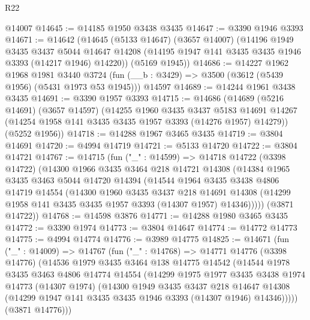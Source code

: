 \begin{lexlean}{R22}
\begin{coremodule}
    @14007
@14645 := @14185 @1950 @3438 @3435
@14647 := @3390 @1946 @3393
@14671 := @14642
    (@14645
      (@5133 @14647)
      (@3657 @14007)
      (@14196
        @1949
        @3435
        @3437
        @5044
        @14647
        @14208
        (@14195 @1947 @141 @3435 @3435 @1946 @3393 (@14217 @1946) @14220))
      (@5169 @1945))
@14686 := @14227
    @1962
    @1968
    @1981
    @3440
    @3724
    (fun (__b : @3429) => @3500 (@3612 (@5439 @1956) (@5431 @1973 @53 @1945)))
    @14597
@14689 := @14244 @1961 @3438 @3435
@14691 := @3390 @1957 @3393
@14715 := @14686
    (@14689
      (@5216 @14691)
      (@3657 @14597)
      (@14255
        @1960
        @3435
        @3437
        @5183
        @14691
        @14267
        (@14254 @1958 @141 @3435 @3435 @1957 @3393 (@14276 @1957) @14279))
      (@5252 @1956))
@14718 := @14288 @1967 @3465 @3435
@14719 := @3804 @14691
@14720 := @4994 @14719
@14721 := @5133 @14720
@14722 := @3804 @14721
@14767 := @14715
    (fun ("_" : @14599) =>
    @14718
      @14722
      (@3398 @14722)
      (@14300
        @1966
        @3435
        @3464
        @218
        @14721
        @14308
        (@14384
          @1965
          @3435
          @3463
          @5044
          @14720
          @14394
          (@14544
            @1964
            @3435
            @3438
            @4806
            @14719
            @14554
            (@14300
              @1960
              @3435
              @3437
              @218
              @14691
              @14308
              (@14299 @1958 @141 @3435 @3435 @1957 @3393 (@14307 @1957) @14346)))))
      (@3871 @14722))
@14768 := @14598 @3876
@14771 := @14288 @1980 @3465 @3435
@14772 := @3390 @1974
@14773 := @3804 @14647
@14774 := @14772 @14773
@14775 := @4994 @14774
@14776 := @3989 @14775
@14825 := @14671
    (fun ("_" : @14009) =>
    @14767
      (fun ("_" : @14768) =>
      @14771
        @14776
        (@3398 @14776)
        (@14536
          @1979
          @3435
          @3464
          @138
          @14775
          @14542
          (@14544
            @1978
            @3435
            @3463
            @4806
            @14774
            @14554
            (@14299
              @1975
              @1977
              @3435
              @3438
              @1974
              @14773
              (@14307 @1974)
              (@14300
                @1949
                @3435
                @3437
                @218
                @14647
                @14308
                (@14299 @1947 @141 @3435 @3435 @1946 @3393 (@14307 @1946) @14346)))))
        (@3871 @14776)))

\end{coremodule}
\end{lexlean}

